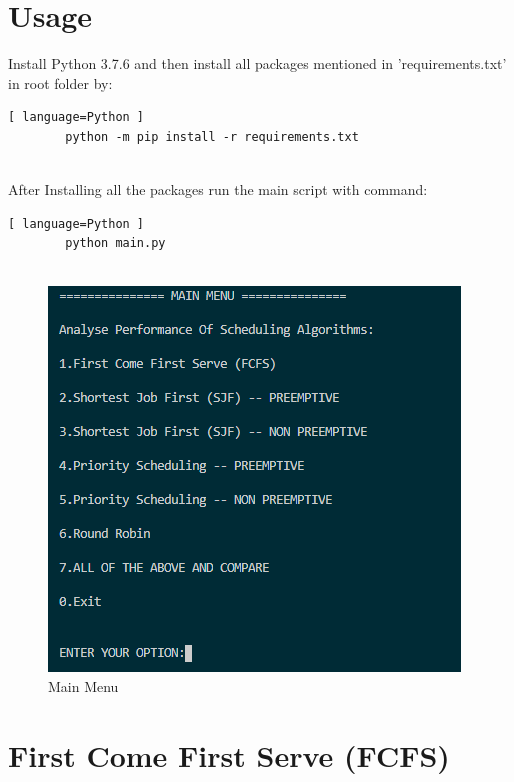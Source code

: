 \documentclass[11pt,a4paper]{report}
\begin{document}
\chapter{Usage}

Install Python 3.7.6 and then install all packages mentioned in 'requirements.txt' in root folder by:

	\begin{lstlisting}[ language=Python ]
		python -m pip install -r requirements.txt
		
	\end{lstlisting}

After Installing all the packages run the main script with command:

\begin{center}
	\begin{lstlisting}[ language=Python ]
		python main.py
		
	\end{lstlisting}
\end{center}


\begin{figure}[H]
\begin{center}
\includegraphics{./img/main.PNG}
\caption{Main Menu}
\label{fig}
\end{center}
\end{figure}



\tableofcontents

\chapter{First Come First Serve (FCFS)}
\end{document}
